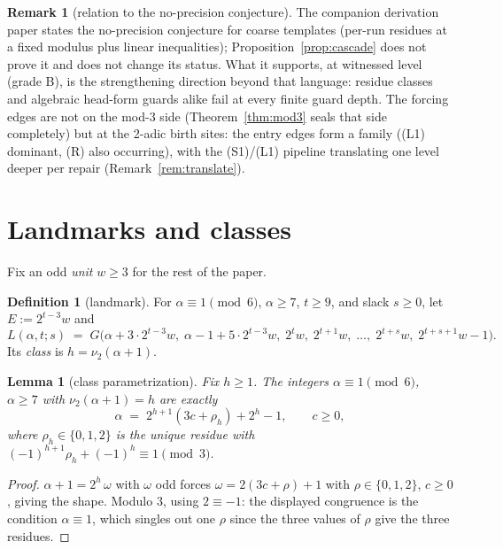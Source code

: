 \documentclass[11pt]{amsart}
\newtheorem{lemma}[theorem]{Lemma}
\theoremstyle{definition}
\newtheorem{definition}[theorem]{Definition}
\newtheorem{remark}[theorem]{Remark}
\newcommand{\vtwo}[1]{\nu_2(#1)}
\begin{document}
\begin{remark}[relation to the no-precision conjecture]\label{rem:noprec2}
The companion derivation paper states the no-precision conjecture for coarse
templates (per-run residues at a fixed modulus plus linear inequalities);
Proposition~\ref{prop:cascade} does not prove it and does not change its
status. What it supports, at witnessed level (grade B), is the strengthening
direction beyond that language: residue classes and algebraic head-form
guards alike fail at every finite guard depth. The forcing edges are not on
the mod-3 side (Theorem~\ref{thm:mod3} seals that side completely) but at
the 2-adic birth sites: the entry edges form a family ((L1) dominant, (R)
also occurring), with the (S1)/(L1) pipeline translating one level deeper
per repair (Remark~\ref{rem:translate}).
\end{remark}

\section{Landmarks and classes}\label{s:landmark}

Fix an odd \emph{unit} $w\ge3$ for the rest of the paper.

\begin{definition}[landmark]\label{def:landmark}
For $\alpha\equiv1\pmod6$, $\alpha\ge7$, $t\ge9$, and slack $s\ge0$, let
$E:=2^{t-3}w$ and
\[
L(\alpha,t;s)\;=\;G\bigl(\alpha+3\cdot2^{t-3}w,\;\alpha-1+5\cdot2^{t-3}w,\;
2^{t}w,\;2^{t+1}w,\;\dots,\;2^{t+s}w,\;2^{t+s+1}w-1\bigr).
\]
Its \emph{class} is $h=\vtwo{\alpha+1}$.
\end{definition}

\begin{lemma}[class parametrization]\label{lem:class}
Fix $h\ge1$. The integers $\alpha\equiv1\pmod6$, $\alpha\ge7$ with
$\vtwo{\alpha+1}=h$ are exactly
\[
\alpha \;=\; 2^{h+1}(3c+\rho_h)+2^{h}-1,\qquad c\ge0,
\]
where $\rho_h\in\{0,1,2\}$ is the unique residue with
$(-1)^{h+1}\rho_h+(-1)^{h}\equiv1\pmod3$.
\end{lemma}

\begin{proof}
$\alpha+1=2^{h}\,\omega$ with $\omega$ odd forces
$\omega=2(3c+\rho)+1$ with $\rho\in\{0,1,2\}$, $c\ge0$, giving the shape.
Modulo $3$, using $2\equiv-1$: the displayed congruence is the condition
$\alpha\equiv1$, which singles out one $\rho$ since the three values of
$\rho$ give the three residues.
\end{proof}
\end{document}
